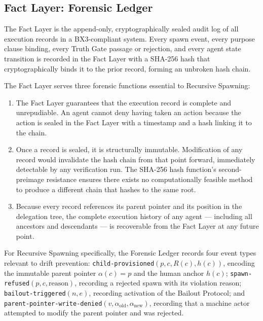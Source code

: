 \subsection{Fact Layer: Forensic Ledger}

The Fact Layer is the append-only, cryptographically sealed audit log of all execution records in a BX3-compliant system. Every spawn event, every purpose clause binding, every Truth Gate passage or rejection, and every agent state transition is recorded in the Fact Layer with a SHA-256 hash that cryptographically binds it to the prior record, forming an unbroken hash chain.

The Fact Layer serves three forensic functions essential to Recursive Spawning:

\begin{enumerate}
  \item[\textbf{Completeness.}] The Fact Layer guarantees that the execution record is complete and unrepudiable. An agent cannot deny having taken an action because the action is sealed in the Fact Layer with a timestamp and a hash linking it to the chain.
  \item[\textbf{Immutability.}] Once a record is sealed, it is structurally immutable. Modification of any record would invalidate the hash chain from that point forward, immediately detectable by any verification run. The SHA-256 hash function's second-preimage resistance ensures there exists no computationally feasible method to produce a different chain that hashes to the same root.
  \item[\textbf{Reconstructability.}] Because every record references its parent pointer and its position in the delegation tree, the complete execution history of any agent — including all ancestors and descendants — is recoverable from the Fact Layer at any future point.
\end{enumerate}

For Recursive Spawning specifically, the Forensic Ledger records four event types relevant to drift prevention: \texttt{child-provisioned}$(p, c, R(c), h(c))$, encoding the immutable parent pointer $\alpha(c) = p$ and the human anchor $h(c)$; \texttt{spawn-refused}$(p, c, \text{reason})$, recording a rejected spawn with its violation reason; \texttt{bailout-triggered}$(n, e)$, recording activation of the Bailout Protocol; and \texttt{parent-pointer-write-denied}$(v, \alpha_{\text{old}}, \alpha_{\text{new}})$, recording that a machine actor attempted to modify the parent pointer and was rejected.

